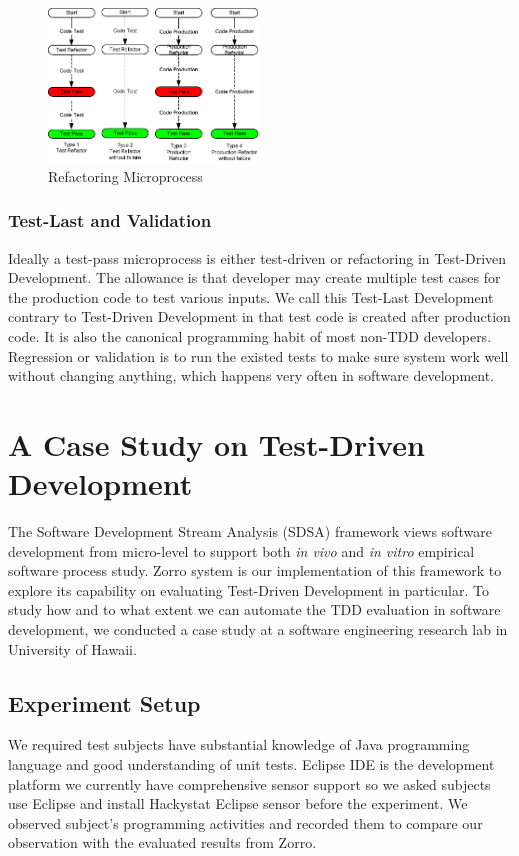 \documentclass[11pt,twocolumn]{article}
\begin{document}
\begin{figure}[ht] 
  \centering
  \includegraphics[width=0.5\textwidth]{picture/Refactoring-Microprocess.eps}
  \caption{Refactoring Microprocess}\label{fig:Refactoring}
\end{figure} 

\subsubsection{Test-Last and Validation}
Ideally a test-pass microprocess is either test-driven or refactoring in
Test-Driven Development. The allowance is that developer may create
multiple test cases for the production code to test various inputs. We call
this Test-Last Development contrary to Test-Driven Development in that test
code is created after production code. It is also the canonical programming
habit of most non-TDD developers. Regression or validation is to run the
existed tests to make sure system work well without changing anything,
which happens very often in software development. 

\section{A Case Study on Test-Driven Development}
\label{sec:casestudy}
The Software Development Stream Analysis (SDSA) framework views software
development from micro-level to support both \textit{in vivo} and \textit{in
  vitro} empirical software process study. Zorro system is our
implementation of this framework to explore its capability on evaluating
Test-Driven Development in particular. To study how and to what extent we
can automate the TDD evaluation in software development, we conducted a
case study at a software engineering research lab in University of Hawaii.

\subsection{Experiment Setup}
We required test subjects have substantial knowledge of Java programming
language and good understanding of unit tests. Eclipse IDE is the
development platform we currently have comprehensive sensor support so we
asked subjects use Eclipse and install Hackystat Eclipse sensor
\cite{HackystatSensor} before the experiment. We observed subject's
programming activities and recorded them to compare our observation with
the evaluated results from Zorro.
\end{document}
